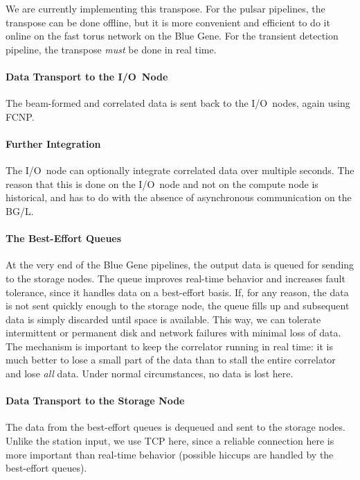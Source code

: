 We are currently implementing this transpose.
For the pulsar pipelines, the transpose can be done offline, but it is more
convenient and efficient to do it online on the fast torus network on the
Blue Gene.
For the transient detection pipeline, the transpose \emph{must\/} be done
in real time.


\paragraph{Data Transport to the I/O~Node }
The beam-formed and correlated data is sent back to the I/O~nodes, again
using FCNP.

\paragraph{Further Integration }
The I/O~node can optionally integrate correlated data over multiple seconds.
The reason that this is done on the I/O~node and not on the compute node is
historical, and has to do with the absence of asynchronous communication
on the BG/L.


\paragraph{The Best-Effort Queues }
At the very end of the Blue Gene pipelines, the output data is queued for
sending to the storage nodes.
The queue improves real-time behavior and increases fault tolerance, since
it handles data on a best-effort basis.
If, for any reason, the data is not sent quickly enough to the storage node,
the queue fills up and subsequent data is simply discarded until space is
available.
This way, we can tolerate intermittent or permanent disk and network failures
with minimal loss of data.
The mechanism is important to keep the correlator running in real
time: it is much better to lose a small part of the data than to stall the
entire correlator and lose \emph{all\/} data.
Under normal circumstances, no data is lost here.


\paragraph{Data Transport to the Storage Node }
The data from the best-effort queues is dequeued and sent to the storage nodes.
Unlike the station input, we use TCP here, since a reliable connection here
is more important than real-time behavior (possible hiccups are handled by
the best-effort queues).


